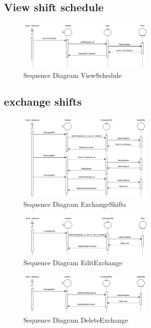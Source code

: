 \subsection{View shift schedule}

    \begin{figure}[h]
    \centering
    \includegraphics[width=0.6\textwidth]{Sequence 5.1.png}
    \caption{Sequence Diagram ViewSchedule}
    \end{figure}

\subsection{exchange shifts}

    \begin{figure}[h]
    \centering
    \includegraphics[width=0.6\textwidth]{Sequence 6.1.png}
    \caption{Sequence Diagram ExchangeShifts}
    \end{figure}
    
    \begin{figure}[h]
        \centering
        \includegraphics[width=0.6\textwidth]{Sequence 6.2.png}
        \caption{Sequence Diagram EditExchange}
        \end{figure}

    \begin{figure}[h]
    \centering
    \includegraphics[width=0.6\textwidth]{Sequence 6.3.png}
    \caption{Sequence Diagram DeleteExchange}
    \end{figure}

